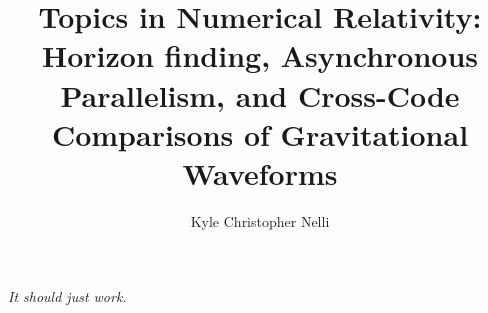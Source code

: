 \documentclass[11pt]{caltech_thesis}
\begin{document}
\pagestyle{ruled}

\title{Topics in Numerical Relativity: Horizon finding, Asynchronous
Parallelism, and Cross-Code Comparisons of Gravitational Waveforms
}
\author{Kyle Christopher Nelli}

\address{Pasadena, California}                     %



\titlingpageend{\clearpage}{\clearpage}
\maketitle[logo]

\newpage
\thispagestyle{empty}
\vspace*{\fill}
\begin{center}
  \textit{It should just work.}\texttrademark
\end{center}
\vspace*{\fill}
\newpage
\end{document}
